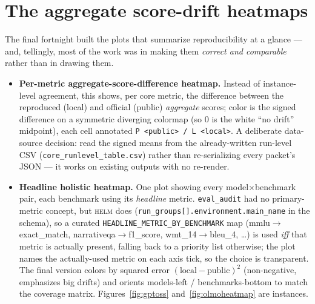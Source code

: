 \documentclass[11pt]{report}
\newcommand{\code}[1]{\texttt{#1}}
\begin{document}
\section{The aggregate score-drift heatmaps}

The final fortnight built the plots that summarize reproducibility at a glance ---
and, tellingly, most of the work was in making them \emph{correct and comparable}
rather than in drawing them.

\begin{itemize}
  \item \textbf{Per-metric aggregate-score-difference heatmap.} Instead of
        instance-level agreement, this shows, per core metric, the difference
        between the reproduced (local) and official (public) \emph{aggregate}
        scores; color is the signed difference on a symmetric diverging colormap
        (so $0$ is the white ``no drift'' midpoint), each cell annotated
        \code{P <public> / L <local>}. A deliberate data-source decision: read the
        signed means from the already-written run-level CSV
        (\code{core\_runlevel\_table.csv}) rather than re-serializing every packet's
        JSON --- it works on existing outputs with no re-render.
  \item \textbf{Headline holistic heatmap.} One plot showing every
        model$\times$benchmark pair, each benchmark using its \emph{headline}
        metric. \code{eval\_audit} had no primary-metric concept, but \textsc{helm}
        does (\code{run\_groups[].environment.main\_name} in the schema), so a
        curated \code{HEADLINE\_METRIC\_BY\_BENCHMARK} map (mmlu$\to$exact\_match,
        narrativeqa$\to$f1\_score, wmt\_14$\to$bleu\_4, \ldots) is used \emph{iff}
        that metric is actually present, falling back to a priority list otherwise;
        the plot names the actually-used metric on each axis tick, so the choice is
        transparent. The final version colors by squared error
        $(\text{local}-\text{public})^2$ (non-negative, emphasizes big drifts) and
        orients models-left / benchmarks-bottom to match the coverage matrix.
        Figures~\ref{fig:gptoss} and~\ref{fig:olmoheatmap} are instances.
\end{itemize}
\end{document}
